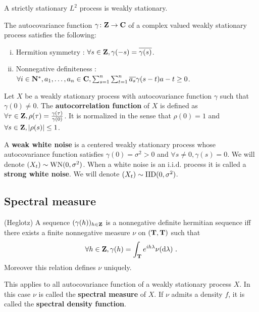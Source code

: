 	A strictly stationary $L^2$ process is weakly stationary.

	\begin{pop}
		The autocovariance function $\gamma \colon \mathbf{Z} \to \mathbf{C}$ of a complex valued weakly stationary process satisfies the following:
		\begin{enumerate}[(i)]
			\item Hermition symmetry : $\forall s \in \mathbf{Z}, \gamma(-s) = \overline{\gamma(s)}$.
			\item Nonnegative definiteness : $\forall i \in \mathbf{N}^*, a_1, \ldots, a_n \in \mathbf{C}, \sum_{s = 1}^n \sum_{t = 1}^n \overline{a_s} \gamma(s - t) a-t \geq 0$.
		\end{enumerate}
	\end{pop}
	
	\begin{defn}
		Let $X$ be a weakly stationary process with autocovariance function $\gamma$ such that $\gamma(0) \neq 0$.
		The \textbf{autocorrelation function} of $X$ is defined as $\forall \tau \in \mathbf{Z}, \rho(\tau) = \frac{\gamma(\tau)}{\gamma(0)}$.
		It is normalized in the sense that $\rho(0) = 1$ and $\forall s \in \mathbf{Z}, \left\lvert\rho(s)\right\rvert \leq 1$.
	\end{defn}

	\begin{defn}
		A \textbf{weak white noise} is a centered weakly stationary process whose autocovariance function satisfies $\gamma(0) = \sigma^2 > 0$ and $\forall s \neq 0, \gamma(s) = 0$.
		We will denote $(X_t) \sim \operatorname{WN}(0,\sigma^2)$.
		When a white noise is an i.i.d. process it is called a \textbf{strong white noise}.
		We will denote $(X_t) \sim \operatorname{IID}(0,\sigma^2)$.
	\end{defn}


\subsection{Spectral measure}

	\begin{thm}(Heglotz)
		A sequence $(\gamma(h))_{h \in \mathbf{Z}}$ is a nonnegative definite hermitian sequence iff there exists a finite nonnegative measure $\nu$ on $(\mathbf{T},\mathcal{\mathbf{T}})$ such that
		$$\forall h \in \mathbf{Z}, \gamma(h) = \int_{\mathbf{T}} e^{ih \lambda} \nu(\mathop{}\mathopen{}\mathrm{d} \lambda)\ .$$
		Moreover this relation defines $\nu$ uniquely.
	\end{thm}

	\begin{rem}
		This applies to all autocovariance function of a weakly stationary process $X$.
		In this case $\nu$ is called the \textbf{spectral measure} of $X$.
		If $\nu$ admits a density $f$, it is called the \textbf{spectral density function}.
	\end{rem}

